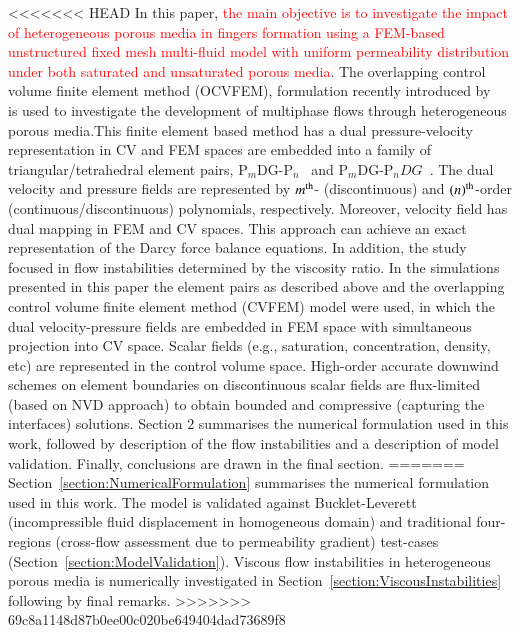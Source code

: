 \documentclass[preprint,authoryear,12pt]{elsarticle}
\begin{document}
<<<<<<< HEAD
In this paper, \textcolor{red}{the main objective is to investigate the impact of heterogeneous porous media in fingers formation using a FEM-based unstructured fixed mesh multi-fluid model with uniform permeability distribution under both saturated and unsaturated porous media}. The overlapping control volume finite element method (OCVFEM), formulation recently introduced by~\citet{jackson_2013}~\citep[see also][]{gomes_2013,pavlidis_2013} is used to investigate the development of multiphase flows through heterogeneous porous media.This finite element based method has a dual pressure-velocity representation in CV and FEM spaces  are embedded into a family of triangular/tetrahedral element pairs, P$_{m}$DG-P$_{n}$~\citep{cotter_2009b} and P$_{m}$DG-P$_{n}DG$~\citep{xie_2014}. The dual velocity and pressure fields are represented by $m^{\rm th}$- (discontinuous) and $({n})^{\rm th}$-order (continuous/discontinuous) polynomials, respectively.
Moreover, velocity field has dual mapping in FEM and CV spaces. This approach can achieve an exact representation of the Darcy force balance equations. 
In addition, the study focused in flow instabilities determined by the viscosity ratio. In the simulations presented in this paper the element pairs as described above and the overlapping control volume finite element method (CVFEM) model were used, in which the dual velocity-pressure fields are embedded in FEM space with simultaneous projection into CV space. Scalar fields (e.g., saturation, concentration, density, etc) are represented in the control volume space. High-order accurate downwind schemes on element boundaries on discontinuous scalar fields are flux-limited (based on NVD approach) to obtain bounded and compressive (capturing the interfaces) solutions. Section $2$ summarises the numerical formulation used in this work, followed by description of the flow instabilities  and a description of model validation. Finally, conclusions are drawn in the final section. 
=======
Section~\ref{section:NumericalFormulation} summarises the numerical formulation used in this work. The model is validated against Bucklet-Leverett (incompressible fluid displacement in homogeneous domain) and traditional four-regions (cross-flow assessment due to permeability gradient) test-cases (Section~\ref{section:ModelValidation}). Viscous flow instabilities in heterogeneous porous media is numerically investigated in Section~\ref{section:ViscousInstabilities} following by final remarks.
>>>>>>> 69c8a1148d87b0ee00c020be649404dad73689f8
\end{document}
